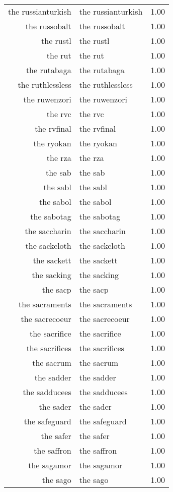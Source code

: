 \begin{table}[ht]
\begin{tabular}{rlr}
  the russianturkish & the russianturkish & 1.00 \\ 
  the russobalt & the russobalt & 1.00 \\ 
  the rustl & the rustl & 1.00 \\ 
  the rut & the rut & 1.00 \\ 
  the rutabaga & the rutabaga & 1.00 \\ 
  the ruthlessless & the ruthlessless & 1.00 \\ 
  the ruwenzori & the ruwenzori & 1.00 \\ 
  the rvc & the rvc & 1.00 \\ 
  the rvfinal & the rvfinal & 1.00 \\ 
  the ryokan & the ryokan & 1.00 \\ 
  the rza & the rza & 1.00 \\ 
  the sab & the sab & 1.00 \\ 
  the sabl & the sabl & 1.00 \\ 
  the sabol & the sabol & 1.00 \\ 
  the sabotag & the sabotag & 1.00 \\ 
  the saccharin & the saccharin & 1.00 \\ 
  the sackcloth & the sackcloth & 1.00 \\ 
  the sackett & the sackett & 1.00 \\ 
  the sacking & the sacking & 1.00 \\ 
  the sacp & the sacp & 1.00 \\ 
  the sacraments & the sacraments & 1.00 \\ 
  the sacrecoeur & the sacrecoeur & 1.00 \\ 
  the sacrifice & the sacrifice & 1.00 \\ 
  the sacrifices & the sacrifices & 1.00 \\ 
  the sacrum & the sacrum & 1.00 \\ 
  the sadder & the sadder & 1.00 \\ 
  the sadducees & the sadducees & 1.00 \\ 
  the sader & the sader & 1.00 \\ 
  the safeguard & the safeguard & 1.00 \\ 
  the safer & the safer & 1.00 \\ 
  the saffron & the saffron & 1.00 \\ 
  the sagamor & the sagamor & 1.00 \\ 
  the sago & the sago & 1.00 \\ 

\end{tabular}
\end{table}
